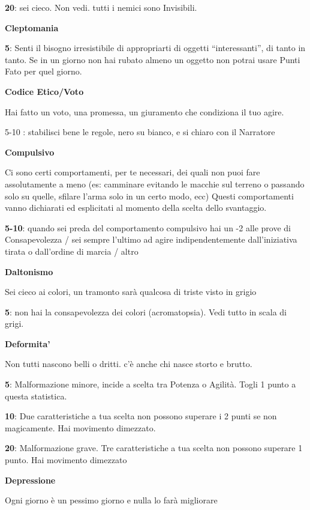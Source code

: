 \documentclass[a4paper,11pt,twoside,openany]{book}
\begin{document}
\textbf{20}: sei cieco. Non vedi. tutti i nemici sono Invisibili.

\textbf{Cleptomania}

\textbf{5}: Senti il bisogno irresistibile di appropriarti di oggetti “interessanti”, di tanto in tanto. Se in un giorno non hai rubato almeno un oggetto non potrai usare Punti Fato per quel giorno.

\textbf{Codice Etico/Voto}

Hai fatto un voto, una promessa, un giuramento che condiziona il tuo agire.

5-10 : stabilisci bene le regole, nero su bianco, e si chiaro con il Narratore

\textbf{Compulsivo}

Ci sono certi comportamenti, per te necessari, dei quali non puoi fare assolutamente a meno (es: camminare evitando le macchie sul terreno o passando solo su quelle, sfilare l'arma solo in un certo modo, ecc)
Questi comportamenti vanno dichiarati ed esplicitati al momento della scelta dello svantaggio.

\textbf{5-10}: quando sei preda del comportamento compulsivo hai un -2 alle prove di Consapevolezza / sei sempre l'ultimo ad agire indipendentemente dall'iniziativa tirata o dall'ordine di marcia / altro

\textbf{Daltonismo}

Sei cieco ai colori, un tramonto sarà qualcosa di triste visto in grigio

\textbf{5}: non hai la consapevolezza dei colori (acromatopsia). Vedi tutto in scala di grigi.

\textbf{Deformita'}

Non tutti nascono belli o dritti. c'è anche chi nasce storto e brutto.

\textbf{5}: Malformazione minore, incide a scelta tra Potenza o Agilità. Togli 1 punto a questa statistica.

\textbf{10}: Due caratteristiche a tua scelta non possono superare i 2 punti se non magicamente. Hai movimento dimezzato.

\textbf{20}: Malformazione grave. Tre caratteristiche a tua scelta non possono superare 1 punto. Hai movimento dimezzato

\textbf{Depressione}

Ogni giorno è un pessimo giorno e nulla lo farà migliorare
\end{document}
